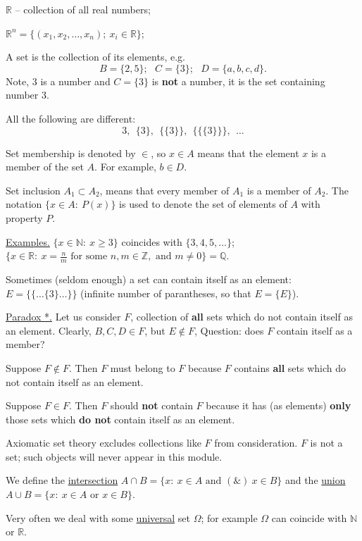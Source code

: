 \documentclass[a4paper,10pt]{article}
\def\NN{\mathbb{N}}
\def\ZZ{\mathbb{Z}}
\def\RR{\mathbb{R}}
\def\QQ{\mathbb{Q}}
\newcommand{\1}[1]{\mathbf{1}_{\{#1\}}}
\begin{document}
$\RR$ -- collection of all real numbers;

$\RR^n=\{(x_1,x_2,\ldots, x_n); ~x_i\in\RR\}$; \vspace{3mm}

A set is the collection of its elements, e.g.
  $$B=\{2,5\};~~~C=\{3\};~~~D=\{a,b,c,d\}.$$
Note, 3 is a number and $C=\{3\}$ is {\bf not} a number, it is the set containing number 3.

All the following are different:
  $$3,~~\{3\},~~\{\{3\}\}, ~~\{\{\{3\}\}\},~~\ldots$$

Set membership is denoted by $\in$, so $x\in A$ means that the element $x$ is a member of the set $A$. For example, $b\in D$.

Set inclusion $A_1\subset A_2$, means that every member of $A_1$ is a member of $A_2$. The notation $\{x\in A:~P(x)\}$ is used to denote the set of elements of $A$ with property $P$.

\underline{Examples.} $\{x\in\NN:~x\ge 3\}$ coincides with $\{3,4,5,\ldots\}$;\\
$\{x\in\RR:~x=\frac{n}{m} \mbox{ for some } n,m\in\ZZ, \mbox{ and } m\ne 0\}=\QQ$.

Sometimes (seldom enough) a set can contain itself as an element: $E=\{\{\ldots \{3\}\ldots \}\}$ (infinite number of parantheses, so that $E=\{E\}$).\vspace{3mm}

\underline{Paradox *.} Let us consider $F$, collection of {\bf all} sets which do not contain itself as an element. Clearly, $B,C,D\in F$, but $E\notin F$, Question: does $F$ contain itself as a member?

Suppose $F\notin F$. Then $F$ must belong to $F$ because $F$ contains {\bf all} sets which do not contain itself as an element.

Suppose $F\in F$. Then $F$ should {\bf not} contain $F$ because it has (as elements) {\bf only } those sets which {\bf do not } contain itself as an element.

Axiomatic set theory excludes collections like $F$ from consideration. $F$ is not a set; such objects will never appear in this module. \vspace{3mm}

We define the \underline{intersection} $A\cap B=\{x:~x\in A \mbox{ and }(\&)~ x\in B\}$ and the \underline{union} $A\cup B=\{x:~x\in A \mbox{ or } x\in B\}$.

Very often we deal with some \underline{universal} set $\Omega$; for example $\Omega$ can coincide with $\NN$ or $\RR$.
\end{document}
